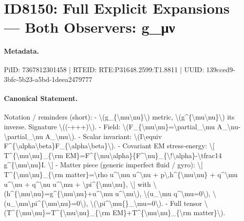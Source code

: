 \section*{ID8150: Full Explicit Expansions — Both Observers: g\_μν}
\paragraph{Metadata.}
PiID: 7367812301458 | RTEID: RTE:P31648.2599:T1.8811 | UUID: 139cced9-3bfc-5b23-a5bd-1deea2479777

\paragraph{Canonical Statement.}
Notation / reminders (short): - \textbackslash{}(g\_\{\textbackslash{}mu\textbackslash{}nu\}\textbackslash{}) metric, \textbackslash{}(g\textasciicircum{}\{\textbackslash{}mu\textbackslash{}nu\}\textbackslash{}) its inverse. Signature \textbackslash{}((-+++)\textbackslash{}). - Field: \textbackslash{}(F\_\{\textbackslash{}mu\textbackslash{}nu\}=\textbackslash{}partial\_\textbackslash{}mu A\_\textbackslash{}nu-\textbackslash{}partial\_\textbackslash{}nu A\_\textbackslash{}mu\textbackslash{}). - Scalar invariant: \textbackslash{}(I\textbackslash{}equiv F\textasciicircum{}\{\textbackslash{}alpha\textbackslash{}beta\}F\_\{\textbackslash{}alpha\textbackslash{}beta\}\textbackslash{}). - Covariant EM stress-energy: \textbackslash{}[ T\textasciicircum{}\{\textbackslash{}mu\textbackslash{}nu\}\_\{\textbackslash{}rm EM\}=F\textasciicircum{}\{\textbackslash{}mu\textbackslash{}alpha\}\{F\textasciicircum{}\textbackslash{}nu\}\_\{\textbackslash{}!\textbackslash{}alpha\}-\textbackslash{}tfrac14 g\textasciicircum{}\{\textbackslash{}mu\textbackslash{}nu\}I. \textbackslash{}] - Matter piece (generic imperfect fluid / gyro): \textbackslash{}[ T\textasciicircum{}\{\textbackslash{}mu\textbackslash{}nu\}\_\{\textbackslash{}rm matter\}=\textbackslash{}rho u\textasciicircum{}\textbackslash{}mu u\textasciicircum{}\textbackslash{}nu + p\textbackslash{},h\textasciicircum{}\{\textbackslash{}mu\textbackslash{}nu\} + q\textasciicircum{}\textbackslash{}mu u\textasciicircum{}\textbackslash{}nu + q\textasciicircum{}\textbackslash{}nu u\textasciicircum{}\textbackslash{}mu + \textbackslash{}pi\textasciicircum{}\{\textbackslash{}mu\textbackslash{}nu\}, \textbackslash{}] with \textbackslash{}(h\textasciicircum{}\{\textbackslash{}mu\textbackslash{}nu\}=g\textasciicircum{}\{\textbackslash{}mu\textbackslash{}nu\}+u\textasciicircum{}\textbackslash{}mu u\textasciicircum{}\textbackslash{}nu\textbackslash{}), \textbackslash{}(u\_\textbackslash{}mu q\textasciicircum{}\textbackslash{}mu=0\textbackslash{}), \textbackslash{}(u\_\textbackslash{}mu\textbackslash{}pi\textasciicircum{}\{\textbackslash{}mu\textbackslash{}nu\}=0\textbackslash{}), \textbackslash{}(\textbackslash{}pi\textasciicircum{}\textbackslash{}mu\{\}\_\textbackslash{}mu=0\textbackslash{}). - Full tensor \textbackslash{}(T\textasciicircum{}\{\textbackslash{}mu\textbackslash{}nu\}=T\textasciicircum{}\{\textbackslash{}mu\textbackslash{}nu\}\_\{\textbackslash{}rm EM\}+T\textasciicircum{}\{\textbackslash{}mu\textbackslash{}nu\}\_\{\textbackslash{}rm matter\}\textbackslash{}).

